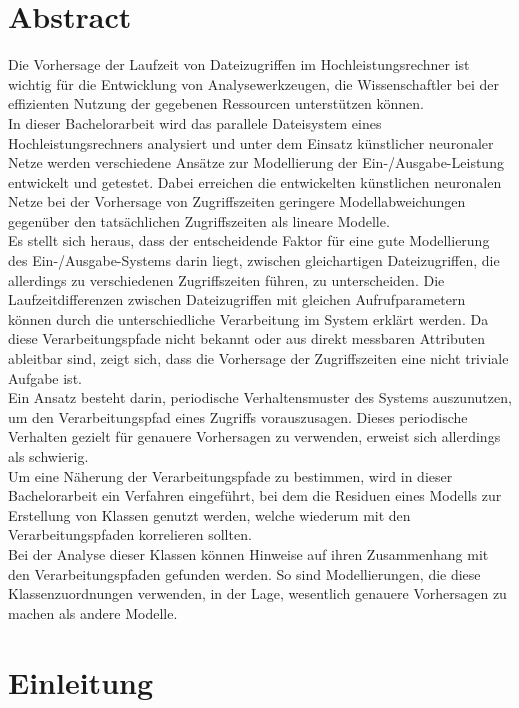 \documentclass[
	12pt,
	a4paper,
	BCOR10mm,
	DIV14,
	listof=totoc,
	bibliography=totoc,
	headsepline
]{scrreprt}
\begin{document}
\chapter*{Abstract}
Die Vorhersage der Laufzeit von Dateizugriffen im Hochleistungsrechner ist wichtig für die Entwicklung von Analysewerkzeugen, die Wissenschaftler bei der effizienten Nutzung der gegebenen Ressourcen unterstützen können.\\
In dieser Bachelorarbeit wird das parallele Dateisystem eines Hochleistungsrechners analysiert und unter dem Einsatz künstlicher neuronaler Netze werden verschiedene Ansätze zur Modellierung der Ein-/Ausgabe-Leistung entwickelt und getestet.
Dabei erreichen die entwickelten künstlichen neuronalen Netze bei der Vorhersage von Zugriffszeiten geringere Modellabweichungen gegenüber den tatsächlichen Zugriffszeiten als lineare Modelle.\\
Es stellt sich heraus, dass der entscheidende Faktor für eine gute Modellierung des Ein-/Ausgabe-Systems darin liegt, zwischen gleichartigen Dateizugriffen, die allerdings zu verschiedenen Zugriffszeiten führen, zu unterscheiden.
Die Laufzeitdifferenzen zwischen Dateizugriffen mit gleichen Aufrufparametern können durch die unterschiedliche Verarbeitung im System erklärt werden.
Da diese Verarbeitungspfade nicht bekannt oder aus direkt messbaren Attributen ableitbar sind, zeigt sich, dass die Vorhersage der Zugriffszeiten eine nicht triviale Aufgabe ist.\\
Ein Ansatz besteht darin, periodische Verhaltensmuster des Systems auszunutzen, um den Verarbeitungspfad eines Zugriffs vorauszusagen. Dieses periodische Verhalten gezielt für genauere Vorhersagen zu verwenden, erweist sich allerdings als schwierig.\\
Um eine Näherung der Verarbeitungspfade zu bestimmen, wird in dieser Bachelorarbeit ein Verfahren eingeführt, bei dem die Residuen eines Modells zur Erstellung von Klassen genutzt werden, welche wiederum mit den Verarbeitungspfaden korrelieren sollten.\\
Bei der Analyse dieser Klassen können Hinweise auf ihren Zusammenhang mit den Verarbeitungspfaden gefunden werden.
So sind Modellierungen, die diese Klassenzuordnungen verwenden, in der Lage, wesentlich genauere Vorhersagen zu machen als andere Modelle. 
\thispagestyle{empty}


\tableofcontents

\chapter{Einleitung}
\label{Einleitung}
\end{document}
